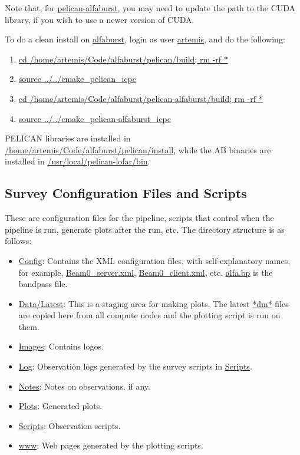 \documentclass{article}
\begin{document}
Note that, for \url{pelican-alfaburst}, you may need to update the path to the
CUDA library, if you wish to use a newer version of CUDA.

To do a clean install on \url{alfaburst}, login as user \url{artemis}, and do
the following:

\begin{enumerate}
\item \url{cd /home/artemis/Code/alfaburst/pelican/build; rm -rf *}
\item \url{source ../../cmake_pelican_icpc}
\item \url{cd /home/artemis/Code/alfaburst/pelican-alfaburst/build; rm -rf *}
\item \url{source ../../cmake_pelican-alfaburst_icpc}
\end{enumerate}

PELICAN libraries are installed in \url{/home/artemis/Code/alfaburst/pelican/install},
while the AB binaries are installed in \url{/usr/local/pelican-lofar/bin}.

\subsection{Survey Configuration Files and Scripts}

These are configuration files for the pipeline, scripts that control when the
pipeline is run, generate plots after the run, etc. The directory structure is
as follows:

\begin{itemize}
\item \url{Config}: Contains the XML configuration files, with self-explanatory
names, for example, \url{Beam0_server.xml}, \url{Beam0_client.xml}, etc.
\url{alfa.bp} is the bandpass file.
\item \url{Data/Latest}: This is a staging area for making plots. The latest
\url{*dm*} files are copied here from all compute nodes and the plotting script
is run on them.
\item \url{Images}: Contains logos.
\item \url{Log}: Observation logs generated by the survey scripts in
\url{Scripts}.
\item \url{Notes}: Notes on observations, if any.
\item \url{Plots}: Generated plots.
\item \url{Scripts}: Observation scripts.
\item \url{www}: Web pages generated by the plotting scripts.
\end{itemize}
\end{document}
